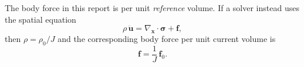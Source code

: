 \documentclass[11pt,a4paper]{article}
\begin{document}
The body force in this report is per unit \emph{reference} volume. If a solver instead uses the spatial equation
%
\begin{equation}
\rho\,\ddot{\textbf{u}}=\nabla_{\textbf{x}}\cdot\boldsymbol{\sigma}+\textbf{f},
\end{equation}
%
then $\rho=\rho_0/J$ and the corresponding body force per unit current volume is
%
\begin{equation}
\boxed{\textbf{f}=\dfrac{1}{J}\,\textbf{f}_0}.
\end{equation}
\end{document}
